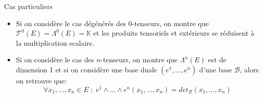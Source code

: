 \documentclass{beamer}
\begin{document}
        \begin{frame}{Cas particuliers}
            \begin{itemize}
                \item Si on considère le cas dégénérés des $0$-tenseurs, on montre que $\mathcal{T}^0(E) = \Lambda^0(E) = \mathbb{K}$ et les produits tensoriels et extérieurs se réduisent à la multiplication scalaire.
                \item Si on considère le cas des $n$-tenseurs, on montre que $\Lambda^n(E)$ est de dimension 1 et si on considère une base duale $(e^1, \ldots, e^n)$ d'une base $ \mathcal{B}$, alors on retrouve que:
                \[ 
                    \forall x_1, \ldots, x_n \in E \; ; \; e^1 \wedge \ldots \wedge e^n(x_1, \ldots, x_n) = det_{\mathcal{B}}(x_1, \ldots, x_n)
                 \]
            \end{itemize}
        \end{frame}     
\end{document}
